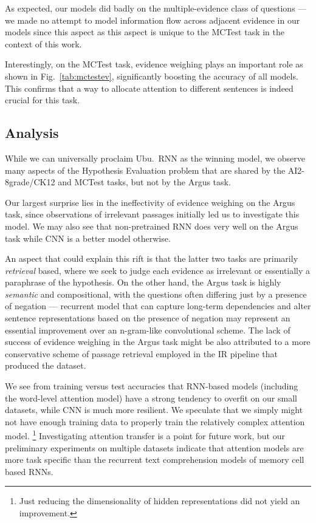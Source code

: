 \documentclass[11pt]{article}
\begin{document}
As expected, our models did badly on the multiple-evidence class of questions
--- we made no attempt to model information flow across adjacent evidence in our
models since this aspect as this aspect is unique to the MCTest task in the
context of this work.


Interestingly, on the MCTest task, evidence weighing plays an important role
as shown in Fig.~\ref{tab:mctestev},
significantly boosting the accuracy of all models.
This confirms that a way to allocate attention to different sentences
is indeed crucial for this task.

\subsection{Analysis}

While we can universally proclaim Ubu.\ RNN as the winning model,
we observe many aspects of the Hypothesis Evaluation problem that are shared
by the AI2-8grade/CK12 and MCTest tasks, but not by the Argus task.

Our largest surprise lies in the ineffectivity of evidence weighing
on the Argus task, since observations of irrelevant passages initially
led us to investigate this model.  %
We may also see that non-pretrained RNN does very well on the Argus task
while CNN is a better model otherwise.

An aspect that could explain this rift is that the latter two tasks
are primarily \textit{retrieval} based, where we seek to judge each
evidence as irrelevant or essentially a paraphrase of the hypothesis.
On the other hand, the Argus task is highly \textit{semantic}
and compositional, with the questions often differing just by a presence
of negation --- recurrent model that can capture long-term dependencies
and alter sentence representations based on the presence of negation
may represent an essential improvement over an n-gram-like convolutional
scheme.
The lack of success of evidence weighing in the Argus task might be also
attributed to a more conservative scheme of passage retrieval employed
in the IR pipeline that produced the dataset.

We see from training versus test accuracies that RNN-based
models (including the word-level attention model) have a strong tendency
to overfit on our small datasets, while CNN is much more resilient.
We speculate that we simply might not have enough training data to
properly train the relatively complex attention model.%
\footnote{Just reducing the dimensionality of hidden representations did not yield an improvement.}
Investigating attention transfer is a point for future work, but
our preliminary experiments on multiple datasets indicate that attention
models are more task specific than the recurrent text comprehension models
of memory cell based RNNs.
\end{document}
